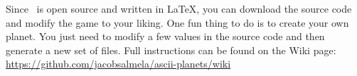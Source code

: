Since \asciiplanets\ is open source and written in LaTeX, you can download the source code and modify the game to your liking.
\newline\newline
One fun thing to do is to create your own planet.  You just need to modify a few values in the source code and then generate a new set of files.  Full instructions can be found on the Wiki page: \url{https://github.com/jacobsalmela/ascii-planets/wiki}
